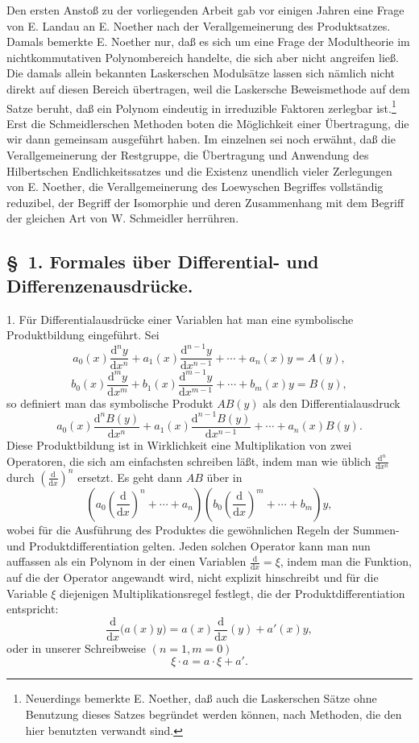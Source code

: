 \documentclass[11pt]{article}
\providecommand{\dd}{\mathrm d}
\providecommand{\dd}{\mathrm d}
\begin{document}
Den ersten Anstoß zu der vorliegenden Arbeit gab vor einigen Jahren eine Frage von E. Landau an E. Noether nach der Verallgemeinerung des Produktsatzes. Damals bemerkte E. Noether nur, daß es sich um eine Frage der Modultheorie im nichtkommutativen Polynombereich handelte, die sich aber nicht angreifen ließ. Die damals allein bekannten Laskerschen Modulsätze lassen sich nämlich nicht direkt auf diesen Bereich übertragen, weil die Laskersche Beweismethode auf dem Satze beruht, daß ein Polynom eindeutig in irreduzible Faktoren zerlegbar ist.\footnote{Neuerdings bemerkte E. Noether, daß auch die Laskerschen Sätze ohne Benutzung dieses Satzes begründet werden können, nach Methoden, die den hier benutzten verwandt sind.} Erst die Schmeidlerschen Methoden boten die Möglichkeit einer Übertragung, die wir dann gemeinsam ausgeführt haben. Im einzelnen sei noch erwähnt, daß die Verallgemeinerung der Restgruppe, die Übertragung und Anwendung des Hilbertschen Endlichkeitssatzes und die Existenz unendlich vieler Zerlegungen von E. Noether, die Verallgemeinerung des Loewyschen Begriffes vollständig reduzibel, der Begriff der Isomorphie und deren Zusammenhang mit dem Begriff der gleichen Art von W. Schmeidler herrühren.

\subsection*{\S~1. Formales über Differential- und Differenzenausdrücke.}

1. Für Differentialausdrücke einer Variablen hat man eine symbolische Produktbildung eingeführt. Sei
\[
 a_0(x)\frac{\dd^n y}{\dd x^n}+a_1(x)\frac{\dd^{n-1}y}{\dd x^{n-1}}+\cdots+a_n(x)y=A(y),
\]
\[
 b_0(x)\frac{\dd^m y}{\dd x^m}+b_1(x)\frac{\dd^{m-1}y}{\dd x^{m-1}}+\cdots+b_m(x)y=B(y),
\]
so definiert man das symbolische Produkt $AB(y)$ als den Differentialausdruck
\[
 a_0(x)\frac{\dd^n B(y)}{\dd x^n}+a_1(x)\frac{\dd^{n-1}B(y)}{\dd x^{n-1}}+\cdots+a_n(x)B(y).
\]
Diese Produktbildung ist in Wirklichkeit eine Multiplikation von zwei Operatoren, die sich am einfachsten schreiben läßt, indem man wie üblich $\frac{\dd^n}{\dd x^n}$ durch $\left(\frac{\dd}{\dd x}\right)^n$ ersetzt. Es geht dann $AB$ über in
\[
 \left(a_0\left(\frac{\dd}{\dd x}\right)^n+\cdots+a_n\right)
 \left(b_0\left(\frac{\dd}{\dd x}\right)^m+\cdots+b_m\right)y,
\]
wobei für die Ausführung des Produktes die gewöhnlichen Regeln der Summen- und Produktdifferentiation gelten. Jeden solchen Operator kann man nun auffassen als ein Polynom in der einen Variablen $\frac{\dd}{\dd x}=\xi$, indem man die Funktion, auf die der Operator angewandt wird, nicht explizit hinschreibt und für die Variable $\xi$ diejenigen Multiplikationsregel festlegt, die der Produktdifferentiation entspricht:
\[
 \frac{\dd}{\dd x}\bigl(a(x)y\bigr)=a(x)\frac{\dd}{\dd x}(y)+a'(x)y,
\]
oder in unserer Schreibweise $(n=1, m=0)$
\begin{equation}
 \xi\cdot a=a\cdot\xi+a'.
\tag{1}
\end{equation}
\end{document}

